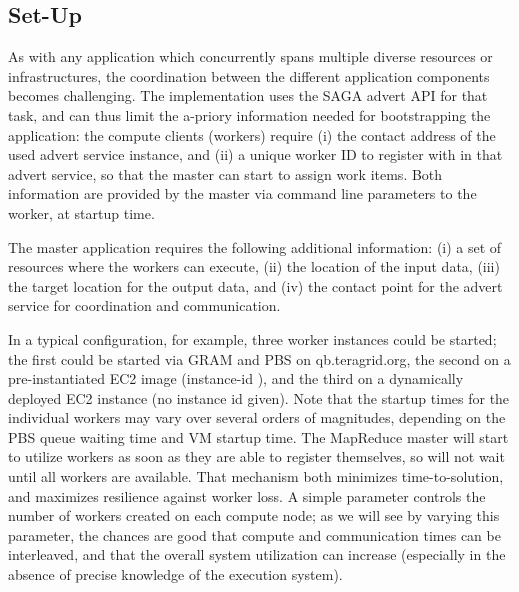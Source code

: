 \documentclass[3p,twocolumn]{elsarticle}
\begin{document}
\subsection{\sagamapreduce Set-Up}

As with any application which concurrently spans multiple diverse
resources or infrastructures, the coordination between the different
application components becomes challenging.  The \smr implementation
uses the SAGA advert API for that task, and can thus limit the a-priory
information needed for bootstrapping the application: the compute
clients (workers) require (i) the contact address of the used advert
service instance, and (ii) a unique worker ID to register with in that
advert service, so that the master can start to assign work items.
Both information are provided by the master via command line
parameters to the worker, at startup time.

The master application requires the following additional information:
(i) a set of resources where the workers can execute, (ii) the
location of the input data, (iii) the target location for the output
data, and (iv) the contact point for the advert service for
coordination and communication.  

In a typical configuration, for example, three worker instances could
be started; the first could be started via GRAM and PBS on
qb.teragrid.org, the second on a pre-instantiated EC2 image
(instance-id ), and the third on a dynamically deployed
EC2 instance (no instance id given).  Note that the startup times for
the individual workers may vary over several orders of magnitudes,
depending on the PBS queue waiting time and VM startup time.  The
MapReduce master will start to utilize workers as soon as they are
able to register themselves, so will not wait until all workers are
available.  That mechanism both minimizes time-to-solution, and
maximizes resilience against worker loss.
%
%
A simple parameter controls the number of workers created on each
compute node; as we will see by varying this parameter, the chances
are good that compute and communication times can be interleaved, and
that the overall system utilization can increase (especially in the
absence of precise knowledge of the execution system).
 
\end{document}
